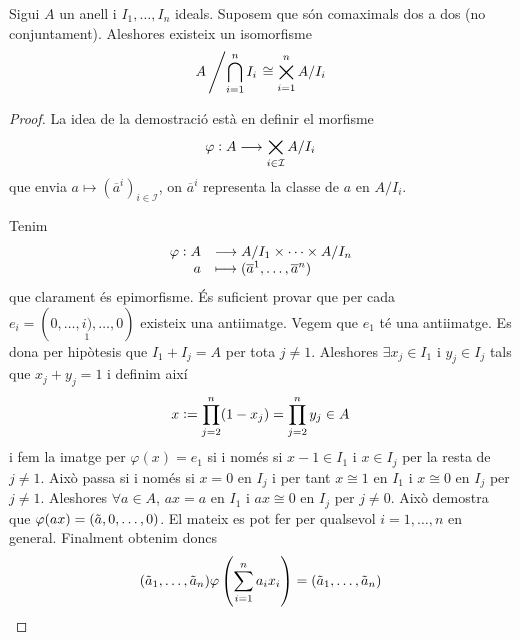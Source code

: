 \documentclass[../../../main.tex]{subfiles}
\begin{document}
\begin{ter}
\label{ter:teoremaXinesResidu} Sigui $A$ un anell i $I_1,\ldots,I_n$ ideals. Suposem que són comaximals dos a dos (no conjuntament). Aleshores existeix un isomorfisme
\begin{equation}
    \notag
    A\left/\bigcap_{i=1}^nI_i\right.\cong \bigtimes_{i=1}^n A/I_i
\end{equation}
\end{ter}
\begin{proof}
La idea de la demostració està en definir el morfisme
\begin{equation}
    \notag
    \varphi:A\longrightarrow \bigtimes_{i\in \mathcal{I}}A/I_i
\end{equation}
que envia $a\mapsto (\overline{a}^{i})_{i\in \mathcal{I}}$, on $\overline{a}^{i}$ representa la classe de $a$ en $A/I_i$.

Tenim
\begin{equation}
    \notag
    \begin{array}{rl}
        \varphi:A & \longrightarrow A/I_1\times\cdots\times A/I_n \\
        a & \longmapsto (\overline{a}^1,\ldots,\overline{a}^n)
    \end{array}
\end{equation}
que clarament és epimorfisme. És suficient provar que per cada $e_i = (0,\ldots,\underset{1}{i)},\ldots,0)$ existeix una antiimatge. Vegem que $e_1$ té una antiimatge. Es dona per hipòtesis que $I_1+I_j = A$ per tota $j\not=1$. Aleshores $\exists x_j\in I_1$ i $y_j\in I_j$ tals que $x_j+y_j = 1$ i definim així
\begin{equation}
    \notag
    x:=\prod_{j=2}^n(1-x_j)= \prod_{j=2}^n y_j\in A
\end{equation}
i fem la imatge per $\varphi(x) = e_1$ si i només si $x-1\in I_1$ i $x\in I_j$ per la resta de $j\not=1$. Això passa si i només si $x = 0$ en $I_j$ i per tant $x\cong 1$ en $I_1$ i $x\cong 0$ en $I_j$ per $j\not=1$. Aleshores $\forall a\in A$, $ax = a$ en $I_1$ i $ax\cong 0$ en $I_j$ per $j\neq 0$. Això demostra que $\varphi(ax) = (\Tilde{a},0,\ldots,0)$. El mateix es pot fer per qualsevol $i = 1,\ldots,n$ en general. Finalment obtenim doncs
\begin{equation}
    \notag
    (\Tilde{a}_1,\ldots,\Tilde{a}_n)\varphi\left(\sum_{i=1}^na_ix_i\right) = (\Tilde{a}_1,\ldots,\Tilde{a}_n)
\end{equation}
\end{proof}
\end{document}

